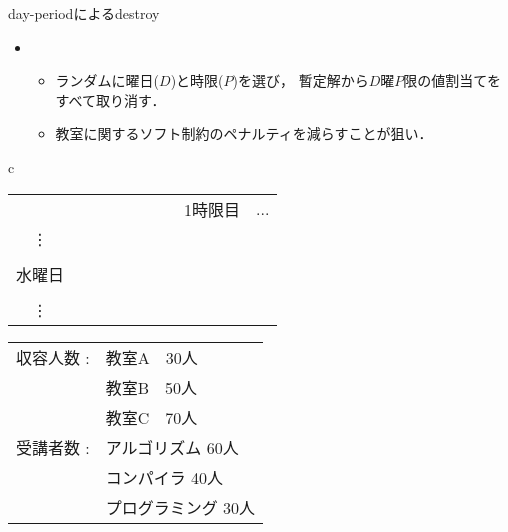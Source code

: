 \documentclass[11pt,dvipdfmx]{beamer}
\begin{document}
\begin{frame}{day-periodによるdestroy}
 \begin{block}{}
 \begin{itemize}
  \item {}
   \begin{itemize}
    \item ランダムに曜日($D$)と時限($P$)を選び，
    暫定解から$D$曜$P$限の値割当てをすべて取り消す．
    \item 教室に関するソフト制約のペナルティを減らすことが狙い．
   \end{itemize}
  \end{itemize}
 \end{block}
  \begin{exampleblock}{}\scriptsize
    \begin{center}
     \begin{tabular}{c}
      \begin{minipage}{5.4cm}
       \begin{center}        
        \begin{tabular}{c|l|c}%
                     &~~~~~~~~~~~~~1時限目& ... \\\cline{1-3}
         \vdots  &                                          &   \\\cline{1-3}
                     &  \structure{教室A : アルゴリズム}     & \\
       水曜日  &  \structure{教室B : コンパイラ}         &   \\
                    &  \structure{教室C : プログラミング}   &  \\\cline{1-3}
       \vdots &                                          &  \\
        \end{tabular}
      \end{center}
     \end{minipage}    
     \begin{minipage}{4.1cm}
      \begin{center}
       \begin{tabular}{rl}%
       収容人数 : & \alert{教室A~~30人}\\
       & 教室B~~50人\\
       & 教室C~~70人\\
       受講者数 : & \alert{アルゴリズム 60人}\\
       & コンパイラ 40人\\
       & プログラミング 30人\\

\end{tabular}
\end{center}
\end{minipage}
\end{tabular}
\end{center}
\end{exampleblock}
\end{frame}
\end{document}
